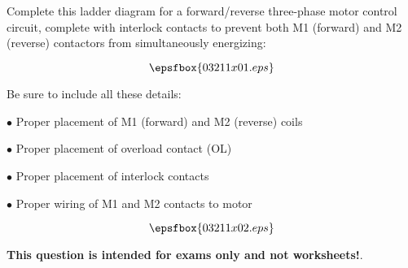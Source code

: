

Complete this ladder diagram for a forward/reverse three-phase motor control circuit, complete with interlock contacts to prevent both M1 (forward) and M2 (reverse) contactors from simultaneously energizing:

$$\epsfbox{03211x01.eps}$$

Be sure to include all these details:

\medskip
\goodbreak
\item{$\bullet$} Proper placement of M1 (forward) and M2 (reverse) coils
\item{$\bullet$} Proper placement of overload contact (OL)
\item{$\bullet$} Proper placement of interlock contacts
\item{$\bullet$} Proper wiring of M1 and M2 contacts to motor
\medskip







$$\epsfbox{03211x02.eps}$$







{\bf This question is intended for exams only and not worksheets!}.




